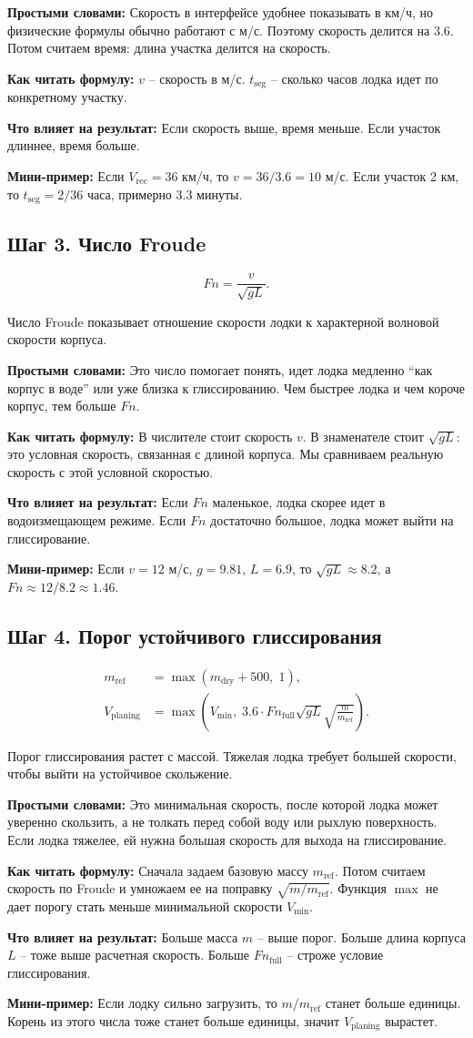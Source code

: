 \documentclass[12pt,a4paper]{article}
\newcommand{\simple}[1]{\par\smallskip\noindent\textbf{Простыми словами:} #1\par}
\newcommand{\howto}[1]{\par\smallskip\noindent\textbf{Как читать формулу:} #1\par}
\newcommand{\effect}[1]{\par\smallskip\noindent\textbf{Что влияет на результат:} #1\par}
\newcommand{\exampletext}[1]{\par\smallskip\noindent\textbf{Мини-пример:} #1\par}
\begin{document}
\simple{Скорость в интерфейсе удобнее показывать в км/ч, но физические формулы
обычно работают с м/с. Поэтому скорость делится на 3.6. Потом считаем время:
длина участка делится на скорость.}
\howto{\(v\) -- скорость в м/с. \(t_{\mathrm{seg}}\) -- сколько часов лодка
идет по конкретному участку.}
\effect{Если скорость выше, время меньше. Если участок длиннее, время больше.}
\exampletext{Если \(V_{\mathrm{rec}}=36\) км/ч, то \(v=36/3.6=10\) м/с.
Если участок 2 км, то \(t_{\mathrm{seg}}=2/36\) часа, примерно 3.3 минуты.}

\subsection{Шаг 3. Число Froude}

\begin{equation}
Fn = \frac{v}{\sqrt{gL}}.
\end{equation}

Число Froude показывает отношение скорости лодки к характерной волновой
скорости корпуса.

\simple{Это число помогает понять, идет лодка медленно ``как корпус в воде''
или уже близка к глиссированию. Чем быстрее лодка и чем короче корпус, тем
больше \(Fn\).}
\howto{В числителе стоит скорость \(v\). В знаменателе стоит
\(\sqrt{gL}\): это условная скорость, связанная с длиной корпуса. Мы сравниваем
реальную скорость с этой условной скоростью.}
\effect{Если \(Fn\) маленькое, лодка скорее идет в водоизмещающем режиме. Если
\(Fn\) достаточно большое, лодка может выйти на глиссирование.}
\exampletext{Если \(v=12\) м/с, \(g=9.81\), \(L=6.9\), то
\(\sqrt{gL}\approx8.2\), а \(Fn\approx12/8.2\approx1.46\).}

\subsection{Шаг 4. Порог устойчивого глиссирования}

\begin{align}
m_{\mathrm{ref}} &= \max\left(m_{\mathrm{dry}} + 500,\; 1\right), \\
V_{\mathrm{planing}} &=
\max\left(
V_{\min},\;
3.6 \cdot Fn_{\mathrm{full}} \sqrt{gL}
\sqrt{\frac{m}{m_{\mathrm{ref}}}}
\right).
\end{align}

Порог глиссирования растет с массой. Тяжелая лодка требует большей скорости,
чтобы выйти на устойчивое скольжение.

\simple{Это минимальная скорость, после которой лодка может уверенно скользить,
а не толкать перед собой воду или рыхлую поверхность. Если лодка тяжелее, ей
нужна большая скорость для выхода на глиссирование.}
\howto{Сначала задаем базовую массу \(m_{\mathrm{ref}}\). Потом считаем
скорость по Froude и умножаем ее на поправку \(\sqrt{m/m_{\mathrm{ref}}}\).
Функция \(\max\) не дает порогу стать меньше минимальной скорости
\(V_{\min}\).}
\effect{Больше масса \(m\) -- выше порог. Больше длина корпуса \(L\) -- тоже
выше расчетная скорость. Больше \(Fn_{\mathrm{full}}\) -- строже условие
глиссирования.}
\exampletext{Если лодку сильно загрузить, то \(m/m_{\mathrm{ref}}\) станет
больше единицы. Корень из этого числа тоже станет больше единицы, значит
\(V_{\mathrm{planing}}\) вырастет.}
\end{document}
